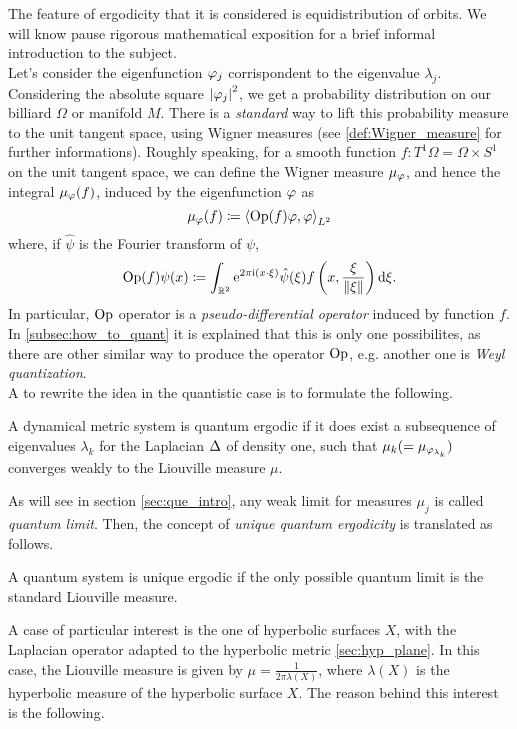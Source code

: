 The feature of ergodicity that it is considered is equidistribution of orbits. We will know pause rigorous mathematical exposition for a brief informal introduction to the subject.\\
Let's consider the eigenfunction $\varphi_{j}$ corrispondent to the eigenvalue $\lambda_{j}$. Considering the absolute square $\left| \varphi_{j}\right|^{2}$, we get a probability distribution on our billiard $\Omega$ or manifold $M$. There is a \emph{standard} way to lift this probability measure to the unit tangent space, using Wigner measures (see \ref{def:Wigner_measure} for further informations). Roughly speaking, for a smooth function $f\colon T^{1}\Omega=\Omega\times S^{1}$   on the unit tangent space, we can define the Wigner measure $\mu_{\varphi}$, and hence the integral $\mu_{\varphi}(f)$, induced by the eigenfunction $\varphi$ as 
\[
\mu_{\varphi}(f)\coloneqq\left< \operatorname{Op}(f)\varphi,\varphi\right>_{L^{2}}
\]
where, if $\hat{\psi}$ is the Fourier transform of $\psi$,
\[
\operatorname{Op}(f)\psi(x)\coloneqq\int_{\mathbb{R}^{2}}\mathrm{e}^{2\pi\mathrm{i}(x\cdot\xi)}\hat{\psi}(\xi)f\left(x,\frac{\xi}{\left\lVert \xi\right\rVert}\right)\mathop{}\!\mathrm{d}\xi.
\]
In particular, $\operatorname{Op}$ operator is a \emph{pseudo-differential operator} induced by function $f$. In \ref{subsec:how_to_quant} it is explained that this is only one possibilites, as there are other similar way to produce the operator $\operatorname{Op}$, e.g. another one is \emph{Weyl quantization}.\\
A  to rewrite the idea  in the quantistic case is to formulate the following.

\begin{defin}
\label{def:roughly_qe_def}
A dynamical metric system is quantum ergodic if it does exist a subsequence of eigenvalues $\lambda_{k}$ for the Laplacian $\operatorname{\Delta}$ of density one, such that $\mu_{k}(=\mu_{\varphi_{\lambda_{k}}})$ converges weakly to the Liouville measure $\mu$.
\end{defin}

As will see in section \ref{sec:que_intro}, any weak limit for measures $\mu_{j}$ is called \emph{quantum limit}. Then, the concept of \emph{unique quantum ergodicity} is translated as follows.

\begin{defin}
\label{def:roughly_que_def}
A quantum system is unique ergodic if the only possible quantum limit is the standard Liouville measure.
\end{defin}

A case of particular interest is the one of hyperbolic surfaces $X$, with the Laplacian operator adapted to the hyperbolic metric \ref{sec:hyp_plane}. In this case, the Liouville measure is given by $\mu=\frac{1}{2\pi\lambda(X)}$, where $\lambda(X)$ is the hyperbolic measure of the hyperbolic surface $X$. The reason behind this interest is the following.

